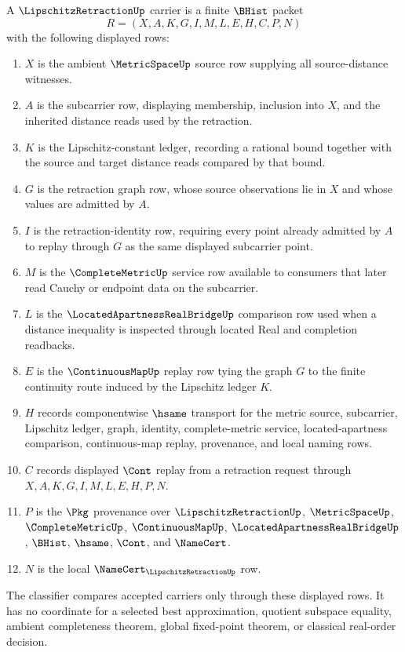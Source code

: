 \begin{definition}
\label{def:lipschitz-retraction-carrier}
A $\LipschitzRetractionUp$ carrier is a finite $\BHist$ packet
$$
R=(X,A,K,G,I,M,L,E,H,C,P,N)
$$
with the following displayed rows:
\begin{enumerate}
\item $X$ is the ambient $\MetricSpaceUp$ source row supplying all source-distance witnesses.
\item $A$ is the subcarrier row, displaying membership, inclusion into $X$, and the inherited distance reads used by the retraction.
\item $K$ is the Lipschitz-constant ledger, recording a rational bound together with the source and target distance reads compared by that bound.
\item $G$ is the retraction graph row, whose source observations lie in $X$ and whose values are admitted by $A$.
\item $I$ is the retraction-identity row, requiring every point already admitted by $A$ to replay through $G$ as the same displayed subcarrier point.
\item $M$ is the $\CompleteMetricUp$ service row available to consumers that later read Cauchy or endpoint data on the subcarrier.
\item $L$ is the $\LocatedApartnessRealBridgeUp$ comparison row used when a distance inequality is inspected through located Real and completion readbacks.
\item $E$ is the $\ContinuousMapUp$ replay row tying the graph $G$ to the finite continuity route induced by the Lipschitz ledger $K$.
\item $H$ records componentwise $\hsame$ transport for the metric source, subcarrier, Lipschitz ledger, graph, identity, complete-metric service, located-apartness comparison, continuous-map replay, provenance, and local naming rows.
\item $C$ records displayed $\Cont$ replay from a retraction request through $X,A,K,G,I,M,L,E,H,P,N$.
\item $P$ is the $\Pkg$ provenance over $\LipschitzRetractionUp$, $\MetricSpaceUp$, $\CompleteMetricUp$, $\ContinuousMapUp$, $\LocatedApartnessRealBridgeUp$, $\BHist$, $\hsame$, $\Cont$, and $\NameCert$.
\item $N$ is the local $\NameCert_{\LipschitzRetractionUp}$ row.
\end{enumerate}
The classifier compares accepted carriers only through these displayed rows. It has no coordinate for a selected best approximation, quotient subspace equality, ambient completeness theorem, global fixed-point theorem, or classical real-order decision.
\end{definition}

